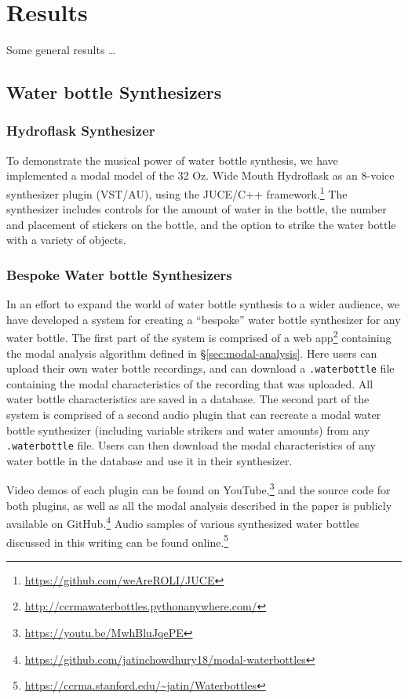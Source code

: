 \documentclass[twoside,a4paper]{article}
\begin{document}
\section{Results} \label{sec:results}
%
Some general results \dots
%
\subsection{Water bottle Synthesizers} \label{sec:synth}

\subsubsection{Hydroflask Synthesizer}
To demonstrate the musical power of water bottle synthesis, we have
implemented a modal model of the 32 Oz. Wide Mouth Hydroflask
as an 8-voice synthesizer plugin (VST/AU), using the JUCE/C++
framework.\footnote{\url{https://github.com/weAreROLI/JUCE}}
The synthesizer includes controls for the amount of water in the bottle,
the number and placement of stickers on the bottle, and the option to
strike the water bottle with a variety of objects. 

\subsubsection{Bespoke Water bottle Synthesizers}
In an effort to expand the world of water bottle synthesis to a wider
audience, we have developed a system for creating a ``bespoke''
water bottle synthesizer for any water bottle. The first part of the
system is comprised of a web app\footnote{\url{http://ccrmawaterbottles.pythonanywhere.com/}}
containing the modal analysis algorithm defined in \S\ref{sec:modal-analysis}. 
Here users can upload their own water bottle recordings, and can download a
\texttt{.waterbottle} file containing the modal characteristics of the
recording that was uploaded. All water bottle characteristics are saved in 
a database. The second part of the system is comprised of
a second audio plugin that can recreate a modal water bottle synthesizer
(including variable strikers and water amounts) from any \texttt{.waterbottle}
file. Users can then download the modal characteristics of any water
bottle in the database and use it in their synthesizer.

Video demos of each plugin can be found on
YouTube,\footnote{\url{https://youtu.be/MwhBluJqePE}}
and the source code for both plugins, as well as all the modal
analysis described in the paper is publicly available on
GitHub.\footnote{\url{https://github.com/jatinchowdhury18/modal-waterbottles}}
Audio samples of various synthesized water bottles discussed in this
writing can be found online.\footnote{\url{https://ccrma.stanford.edu/~jatin/Waterbottles}}
\end{document}

